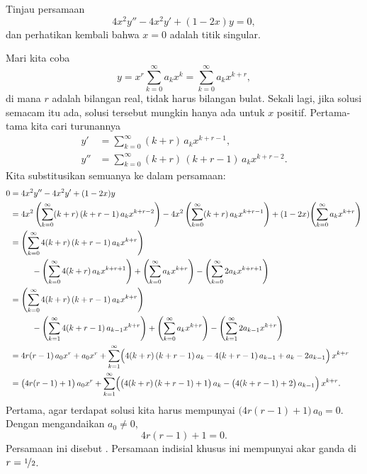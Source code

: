 \begin{example}
Tinjau persamaan
\begin{equation*}
4 x^2 y'' - 4 x^2 y' + (1-2x)y = 0,
\end{equation*}
dan perhatikan kembali bahwa $x=0$ adalah titik singular.

Mari kita coba
\begin{equation*}
y = x^r \sum_{k=0}^\infty a_k x^k
= \sum_{k=0}^\infty a_k x^{k+r} ,
\end{equation*}
di mana $r$ adalah bilangan real, tidak harus bilangan bulat.
Sekali lagi, jika solusi semacam itu ada, solusi tersebut mungkin hanya ada untuk $x$ positif.
Pertama-tama kita cari turunannya
\begin{align*}
y' & = \sum_{k=0}^\infty (k+r)\, a_k x^{k+r-1} , \\
y'' & = \sum_{k=0}^\infty (k+r)\,(k+r-1)\, a_k x^{k+r-2} .
\end{align*}
Kita substitusikan semuanya ke dalam persamaan:
\begin{equation*}
\begin{split}
0 & = 4x^2y''-4x^2y'+(1-2x)y
\\
&= 
4x^2 \, \Biggl( \sum_{k=0}^\infty (k+r)\,(k+r-1) \, a_k x^{k+r-2}  \Biggr)
-
4x^2 \, \Biggl( \sum_{k=0}^\infty (k+r) \, a_k x^{k+r-1}  \Biggr)
+
(1-2x)
\Biggl( \sum_{k=0}^\infty a_k x^{k+r} \Biggr)
\\
&=
\Biggl( \sum_{k=0}^\infty 4 (k+r)\,(k+r-1) \, a_k x^{k+r}  \Biggr)
\\
& \phantom{mmm}
-
\Biggl( \sum_{k=0}^\infty 4 (k+r) \, a_k x^{k+r+1}  \Biggr)
+
\Biggl( \sum_{k=0}^\infty a_k x^{k+r} \Biggr)
-
\Biggl( \sum_{k=0}^\infty 2a_k x^{k+r+1} \Biggr)
\\
&=
\Biggl( \sum_{k=0}^\infty 4 (k+r)\,(k+r-1) \, a_k x^{k+r}  \Biggr)
\\
& \phantom{mmm}
-
\Biggl( \sum_{k=1}^\infty 4 (k+r-1) \, a_{k-1} x^{k+r}  \Biggr)
+
\Biggl( \sum_{k=0}^\infty a_k x^{k+r} \Biggr)
-
\Biggl( \sum_{k=1}^\infty 2a_{k-1} x^{k+r} \Biggr)
\\
&=
4r(r-1) \, a_0 x^r  + a_0 x^r
+ 
\sum_{k=1}^\infty
\Bigl( 4 (k+r)\,(k+r-1) \, a_k
-
4 (k+r-1) \, a_{k-1}
+
a_k
-
2a_{k-1} \Bigr) \, x^{k+r} 
\\
&=
\bigl( 4r(r-1) + 1 \bigr) \, a_0 x^r
+ 
\sum_{k=1}^\infty
\Bigl( \bigl( 4 (k+r)\,(k+r-1) + 1 \bigr) \, a_k
-
\bigl( 4 (k+r-1) + 2 \bigr) \, a_{k-1} \Bigr) \, x^{k+r} .
\end{split}
\end{equation*}
Pertama, agar terdapat solusi kita harus mempunyai
$\bigl( 4r(r-1) + 1 \bigr) \, a_0 = 0$. Dengan mengandaikan $a_0 \neq 0$,
\begin{equation*}
4r(r-1) + 1 = 0 .
\end{equation*}
Persamaan ini disebut \emph{}.
Persamaan indisial khusus ini
mempunyai akar ganda di $r = \nicefrac{1}{2}$.


\end{example}
